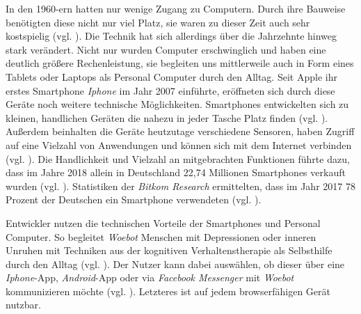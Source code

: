 In den 1960-ern hatten nur wenige Zugang zu Computern. Durch ihre Bauweise benötigten diese nicht nur viel Platz, sie waren zu dieser Zeit auch sehr kostspielig (vgl. \cite{SWB-11524946X}). Die Technik hat sich allerdings über die Jahrzehnte hinweg stark verändert. Nicht nur wurden Computer erschwinglich und haben eine deutlich größere Rechenleistung, sie begleiten uns mittlerweile auch in Form eines Tablets oder Laptops als Personal Computer durch den Alltag. Seit Apple ihr erstes Smartphone \emph{Iphone} im Jahr 2007 einführte, eröffneten sich durch diese Geräte noch weitere technische Möglichkeiten. Smartphones entwickelten sich zu kleinen, handlichen Geräten die nahezu in jeder Tasche Platz finden (vgl. \cite{SWB-481290869}). Außerdem beinhalten die Geräte heutzutage verschiedene Sensoren, haben Zugriff auf eine Vielzahl von Anwendungen und können sich mit dem Internet verbinden (vgl. \cite{SWB-481290869}\cite{AppStore21:online}). Die Handlichkeit und Vielzahl an mitgebrachten Funktionen führte dazu, dass im Jahre 2018 allein in Deutschland 22,74 Millionen Smartphones verkauft wurden (vgl. \cite{Zukunftd37:online}). Statistiken der \emph{Bitkom Research} ermittelten, dass im Jahr 2017 78 Prozent der Deutschen ein Smartphone verwendeten (vgl. \cite{Smartpho6:online}).

Entwickler nutzen die technischen Vorteile der Smartphones und Personal Computer. So begleitet \emph{Woebot} Menschen mit Depressionen oder inneren Unruhen mit Techniken aus der kognitiven Verhaltenstherapie als Selbsthilfe durch den Alltag (vgl. \cite{Fitzpatrick2017}). Der Nutzer kann dabei auswählen, ob dieser über eine \emph{Iphone}-App, \emph{Android}-App oder via \emph{Facebook Messenger} mit \emph{Woebot} kommunizieren möchte (vgl. \cite{WoebotYo93:online}). Letzteres ist auf jedem browserfähigen Gerät nutzbar. 


